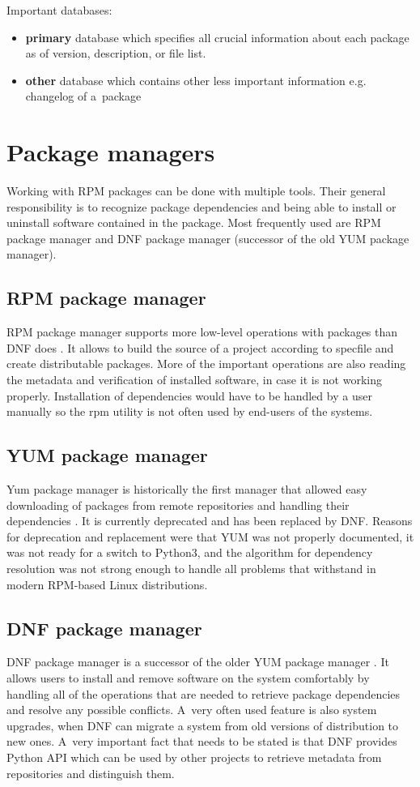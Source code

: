 Important databases:
\begin{itemize}
  \item \textbf{primary} database which specifies all crucial information about each package as of version, description, or file list.
  \item \textbf{other} database which contains other less important information e.g. changelog of a~package
\end{itemize}

\section{Package managers}
Working with RPM packages can be done with multiple tools. Their general responsibility is to recognize
package dependencies and being able to install or uninstall software contained in the package.
Most frequently used are RPM package manager and DNF package manager (successor of the old
YUM package manager).

\subsection*{RPM package manager}
RPM package manager supports more low-level operations with packages than DNF does \cite{RPMPackageManager}. It allows
to build the source of a project according to specfile and create distributable packages. More of the
important operations are also reading the metadata and verification of installed software, in
case it is not working properly. Installation of dependencies would have to be handled by a user
manually so the rpm utility is not often used by end-users of the systems.

\subsection*{YUM package manager}
Yum package manager is historically the first manager that allowed easy downloading of packages
from remote repositories and handling their dependencies \cite{YUMPackageManager}. It is currently deprecated and has been
replaced by DNF. Reasons for deprecation and replacement were that YUM was not properly documented,
it was not ready for a switch to Python3, and the algorithm for dependency resolution was not strong enough
to handle all problems that withstand in modern RPM-based Linux distributions.

\subsection*{DNF package manager}
DNF package manager is a successor of the older YUM package manager \cite{DNFPackageManager}. It allows users to install and remove software
on the system comfortably by handling all of the operations that are needed to retrieve package dependencies
and resolve any possible conflicts. A~very often used feature is also system upgrades, when
DNF can migrate a system from old versions of distribution to new ones. A~very important fact
that needs to be stated is that DNF provides Python API which can be used by other projects to retrieve metadata
from repositories and distinguish them.

